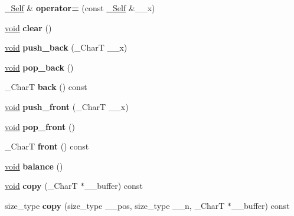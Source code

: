 \begin{DoxyCompactItemize}
\hyperlink{classrope}{\+\_\+\+Self} \& {\bfseries operator=} (const \hyperlink{classrope}{\+\_\+\+Self} \&\+\_\+\+\_\+x)
\item 
\mbox{\label{classrope_a77297202bb0da275e13f0b54146273c5}} 
\hyperlink{interfacevoid}{void} {\bfseries clear} ()
\item 
\mbox{\label{classrope_aee26c5186bc24685f0c638bd79e2a821}} 
\hyperlink{interfacevoid}{void} {\bfseries push\+\_\+back} (\+\_\+\+CharT \+\_\+\+\_\+x)
\item 
\mbox{\label{classrope_ab0240a3710e322766ffd7a9e26730366}} 
\hyperlink{interfacevoid}{void} {\bfseries pop\+\_\+back} ()
\item 
\mbox{\label{classrope_a9a9db1c445502a5f8c6f7ab37542a255}} 
\+\_\+\+CharT {\bfseries back} () const
\item 
\mbox{\label{classrope_a3b7f5e8f19ffb596798a5f79df0e9262}} 
\hyperlink{interfacevoid}{void} {\bfseries push\+\_\+front} (\+\_\+\+CharT \+\_\+\+\_\+x)
\item 
\mbox{\label{classrope_ae4fe24594f005194bffadc60ad875870}} 
\hyperlink{interfacevoid}{void} {\bfseries pop\+\_\+front} ()
\item 
\mbox{\label{classrope_af1db4c98ea071c4759580e43e6d3464e}} 
\+\_\+\+CharT {\bfseries front} () const
\item 
\mbox{\label{classrope_a5f2261af1122f2d8a3376e8f01064478}} 
\hyperlink{interfacevoid}{void} {\bfseries balance} ()
\item 
\mbox{\label{classrope_a2d26f0d1598d32bf45891939356e74c3}} 
\hyperlink{interfacevoid}{void} {\bfseries copy} (\+\_\+\+CharT $\ast$\+\_\+\+\_\+buffer) const
\item 
\mbox{\label{classrope_a30005212e1d2aa20b92c5ebd285f52ac}} 
size\+\_\+type {\bfseries copy} (size\+\_\+type \+\_\+\+\_\+pos, size\+\_\+type \+\_\+\+\_\+n, \+\_\+\+CharT $\ast$\+\_\+\+\_\+buffer) const
\item 
\mbox{\label{classrope_a39046a44dab7458850a5b489c43eb939}} 

\end{DoxyCompactItemize}
